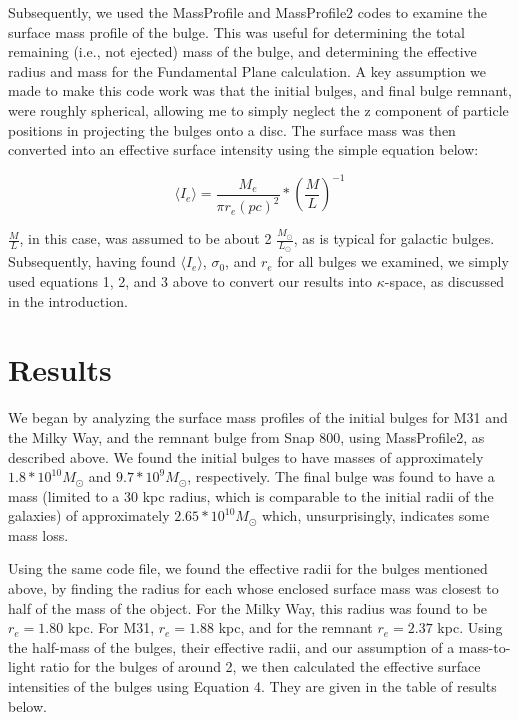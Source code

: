 \documentclass[iop]{emulateapj}
\begin{document}
Subsequently, we used the MassProfile and MassProfile2 codes to examine the surface mass profile of the bulge. This was useful for determining the total remaining (i.e., not ejected) mass of the bulge, and determining the effective radius and mass for the Fundamental Plane calculation. A key assumption we made to make this code work was that the initial bulges, and final bulge remnant, were roughly spherical, allowing me to simply neglect the z component of particle positions in projecting the bulges onto a disc. The surface mass was then converted into an effective surface intensity using the simple equation below:

\begin{equation}
    \langle I_e \rangle = \frac{M_e}{\pi r_e(pc)^2} * (\frac{M}{L})^{-1} 
\end{equation}

$\frac{M}{L}$, in this case, was assumed to be about 2 $\frac{M_\odot}{L_\odot}$, as is typical for galactic bulges. Subsequently, having found $\langle I_e \rangle$, $\sigma_0$, and $r_e$ for all bulges we examined, we simply used equations 1, 2, and 3 above to convert our results into $\kappa$-space, as discussed in the introduction.

\section{Results}

We began by analyzing the surface mass profiles of the initial bulges for M31 and the Milky Way, and the remnant bulge from Snap 800, using MassProfile2, as described above. We found the initial bulges to have masses of approximately $1.8 * 10^{10} M_\odot$ and $9.7 * 10^9 M_\odot$, respectively. The final bulge was found to have a mass (limited to a 30 kpc radius, which is comparable to the initial radii of the galaxies) of approximately $2.65 * 10^{10} M_\odot$ which, unsurprisingly, indicates some mass loss. 

Using the same code file, we found the effective radii for the bulges mentioned above, by finding the radius for each whose enclosed surface mass was closest to half of the mass of the object. For the Milky Way, this radius was found to be $r_e = 1.80$ kpc. For M31, $r_e = 1.88$ kpc, and for the remnant $r_e = 2.37$ kpc. Using the half-mass of the bulges, their effective radii, and our assumption of a mass-to-light ratio for the bulges of around 2, we then calculated the effective surface intensities of the bulges using Equation 4. They are given in the table of results below.
\end{document}
